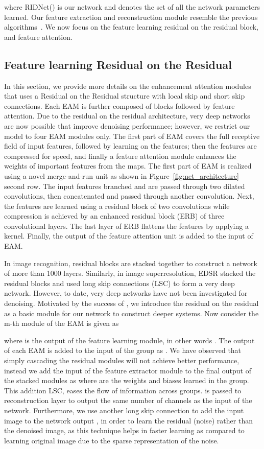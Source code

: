 \documentclass[10pt,twocolumn,letterpaper]{article}
\begin{document}
where RIDNet() is our network and  denotes the set of all the network parameters learned. Our feature extraction  and reconstruction module  resemble the previous algorithms~\cite{dong2016SRCNN,anwar2017chaining}. We now focus on the feature learning residual on the residual block, and feature attention.

\subsection{Feature learning Residual on the Residual}
\label{ss:fl_rir}
In this section, we provide more details on the enhancement attention modules that uses a Residual on the Residual structure with  local skip and short skip connections.  Each EAM is further composed of  blocks followed by feature attention. Due to the residual on the residual architecture, very deep networks are now possible that improve denoising performance; however, we restrict our model to four EAM modules only. The first part of EAM covers the full receptive field of input features, followed by learning on the features; then the features are compressed for speed, and finally a feature attention module enhances the weights of important features from the maps. The first part of EAM is realized using a novel merge-and-run unit as shown in Figure~\ref{fig:net_architecture} second row. The input features branched and are passed through two dilated convolutions, then concatenated and passed through another convolution. Next, the features are learned using a residual block of two convolutions while compression is achieved by an enhanced residual block (ERB) of three convolutional layers. The last layer of ERB flattens the features by applying a  kernel. Finally, the output of the feature attention unit is added to the input of EAM.

In image recognition, residual blocks \cite{he2016deep} are stacked together to construct a network of more than 1000 layers. Similarly, in image superresolution, EDSR \cite{lim2017EDSR} stacked the residual blocks and used long skip connections (LSC) to form a very deep network. However, to date, very deep networks have not been investigated for denoising. Motivated by the success of \cite{zhang2018RCAN}, we introduce the residual on the residual as a basic module for our network to construct deeper systems. Now consider the m-th module of the EAM is given as

where  is the output of the  feature learning module, in other words . The output of each EAM is added to the input of the group as . We have observed that simply cascading the residual modules will not achieve better performance, instead we add the input of the feature extractor module to the final output of the stacked modules as 
where  are the weights and biases learned in the group. This addition \ie LSC, eases the flow of information across groups.  is passed to reconstruction layer to output the same number of channels as the input of the network. Furthermore, we use another long skip connection to add the input image to the network output \ie , in order to learn the residual (noise) rather than the denoised image, as this technique helps in faster learning as compared to learning original image due to the sparse representation of the noise.
\end{document}
